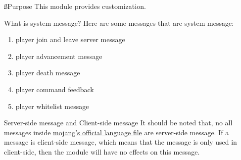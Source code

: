 
\ss{Purpose}
This module provides  customization.

\begin{note}{What is system message?}
    Here are some messages that are system message:
    \begin{enumerate}
        \item player join and leave server message
        \item player advancement message
        \item player death message
        \item player command feedback
        \item player whitelist message
    \end{enumerate}
\end{note}

\begin{note}{Server-side message and Client-side message}
    It should be noted that, no all messages inside \href{https://github.com/sakurawald/fuji-fabric/blob/dev/.github/files/en_us.json}{mojang's official language file} are server-side message.
    If a message is client-side message, which means that the message is only used in client-side, then the module will have no effects on this message.
\end{note}